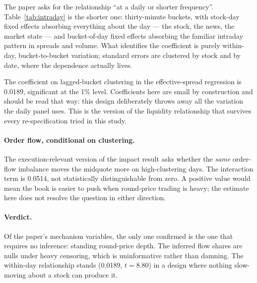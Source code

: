 The paper asks for the relationship ``at a daily or shorter frequency''.
Table~\ref{tab:intraday} is the shorter one: thirty-minute buckets, with
stock-day fixed effects absorbing everything about the day --- the stock, the
news, the market state --- and bucket-of-day fixed effects absorbing the familiar
intraday pattern in spreads and volume. What identifies the coefficient is
purely within-day, bucket-to-bucket variation; standard errors are clustered
by stock and by date, where the dependence actually lives.

The coefficient on lagged-bucket clustering in the effective-spread regression is
0.0189, significant at the 1\% level. Coefficients here are small by construction and
should be read that way: this design deliberately throws away all the variation
the daily panel uses. This is the version of the liquidity relationship that
survives every re-specification tried in this study.

\paragraph{Order flow, conditional on clustering.}
The execution-relevant version of the impact result asks whether the \emph{same}
order-flow imbalance moves the midquote more on high-clustering days. The
interaction term is 0.0514, not statistically distinguishable from zero. A positive value would mean the book is easier to push when round-price trading is heavy; the estimate here does not resolve the question in either direction.

\paragraph{Verdict.}
Of the paper's mechanism variables, the only one confirmed is the one that requires no inference: standing round-price depth. The inferred flow shares are nulls under heavy censoring, which is uninformative rather than damning. The within-day relationship stands (0.0189, $t=8.80$) in a design where nothing slow-moving about a stock can produce it.
